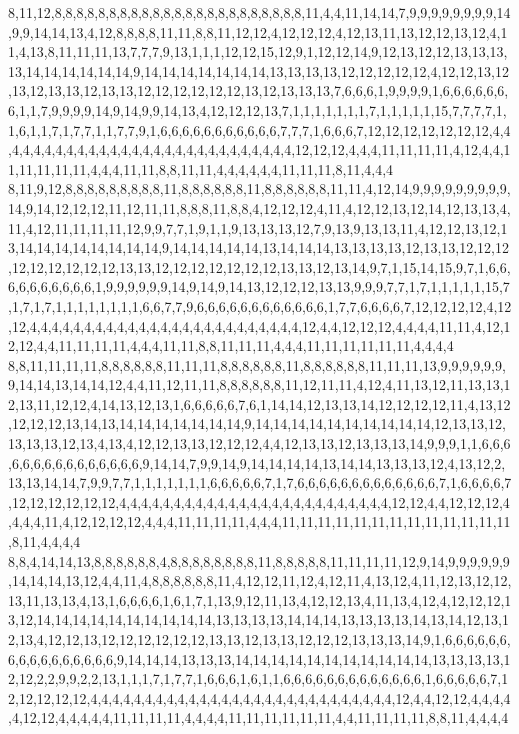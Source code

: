 8,11,12,8,8,8,8,8,8,8,8,8,8,8,8,8,8,8,8,8,8,8,8,8,8,8,11,4,4,11,14,14,7,9,9,9,9,9,9,9,9,14,9,9,14,14,13,4,12,8,8,8,8,11,11,8,8,11,12,12,4,12,12,12,4,12,13,11,13,12,12,13,12,4,11,4,13,8,11,11,11,13,7,7,7,9,13,1,1,1,12,12,15,12,9,1,12,12,14,9,12,13,12,12,13,13,13,13,14,14,14,14,14,14,9,14,14,14,14,14,14,14,13,13,13,13,12,12,12,12,12,4,12,12,13,12,13,12,13,13,12,13,13,12,12,12,12,12,12,13,12,13,13,13,7,6,6,6,1,9,9,9,9,1,6,6,6,6,6,6,6,1,1,7,9,9,9,9,14,9,14,9,9,14,13,4,12,12,12,13,7,1,1,1,1,1,1,1,7,1,1,1,1,1,15,7,7,7,7,1,1,6,1,1,7,1,7,7,1,1,7,7,9,1,6,6,6,6,6,6,6,6,6,6,6,7,7,7,1,6,6,6,7,12,12,12,12,12,12,12,4,4,4,4,4,4,4,4,4,4,4,4,4,4,4,4,4,4,4,4,4,4,4,4,4,4,4,4,12,12,12,4,4,4,11,11,11,11,4,12,4,4,11,11,11,11,11,4,4,4,11,11,8,8,11,11,4,4,4,4,4,4,11,11,11,8,11,4,4,4
8,11,9,12,8,8,8,8,8,8,8,8,8,11,8,8,8,8,8,8,11,8,8,8,8,8,8,11,11,4,12,14,9,9,9,9,9,9,9,9,9,14,9,14,12,12,12,11,12,11,11,8,8,8,11,8,8,4,12,12,12,4,11,4,12,12,13,12,14,12,13,13,4,11,4,12,11,11,11,11,12,9,9,7,7,1,9,1,1,9,13,13,13,12,7,9,13,9,13,13,11,4,12,12,13,12,13,14,14,14,14,14,14,14,14,9,14,14,14,14,14,13,14,14,14,13,13,13,13,12,13,13,12,12,12,12,12,12,12,12,12,13,13,12,12,12,12,12,12,12,13,13,12,13,14,9,7,1,15,14,15,9,7,1,6,6,6,6,6,6,6,6,6,6,1,9,9,9,9,9,9,14,9,14,9,14,13,12,12,12,13,13,9,9,9,7,7,1,7,1,1,1,1,1,15,7,1,7,1,7,1,1,1,1,1,1,1,1,6,6,7,7,9,6,6,6,6,6,6,6,6,6,6,6,6,1,7,7,6,6,6,6,7,12,12,12,12,4,12,12,4,4,4,4,4,4,4,4,4,4,4,4,4,4,4,4,4,4,4,4,4,4,4,4,4,12,4,4,12,12,12,4,4,4,4,11,11,4,12,12,12,4,4,11,11,11,11,4,4,4,11,11,8,8,11,11,11,4,4,4,11,11,11,11,11,11,4,4,4,4
8,8,11,11,11,11,8,8,8,8,8,8,11,11,11,8,8,8,8,8,8,11,8,8,8,8,8,8,11,11,11,13,9,9,9,9,9,9,9,14,14,13,14,14,12,4,4,11,12,11,11,8,8,8,8,8,8,11,12,11,11,4,12,4,11,13,12,11,13,13,12,13,11,12,12,4,14,13,12,13,1,6,6,6,6,6,7,6,1,14,14,12,13,13,14,12,12,12,12,11,4,13,12,12,12,12,13,14,13,14,14,14,14,14,14,14,9,14,14,14,14,14,14,14,14,14,14,12,13,13,12,13,13,13,12,13,4,13,4,12,12,13,13,12,12,12,4,4,12,13,13,12,13,13,13,14,9,9,9,1,1,6,6,6,6,6,6,6,6,6,6,6,6,6,6,6,9,14,14,7,9,9,14,9,14,14,14,14,13,14,14,13,13,13,12,4,13,12,2,13,13,14,14,7,9,9,7,7,1,1,1,1,1,1,1,6,6,6,6,6,7,1,7,6,6,6,6,6,6,6,6,6,6,6,6,6,7,1,6,6,6,6,7,12,12,12,12,12,12,4,4,4,4,4,4,4,4,4,4,4,4,4,4,4,4,4,4,4,4,4,4,4,4,4,12,12,4,4,12,12,12,4,4,4,4,11,4,12,12,12,12,4,4,4,11,11,11,11,4,4,4,11,11,11,11,11,11,11,11,11,11,11,11,11,8,11,4,4,4,4
8,8,4,14,14,13,8,8,8,8,8,8,4,8,8,8,8,8,8,8,8,11,8,8,8,8,8,11,11,11,11,12,9,14,9,9,9,9,9,9,14,14,14,13,12,4,4,11,4,8,8,8,8,8,8,11,4,12,12,11,12,4,12,11,4,13,12,4,11,12,13,12,12,13,11,13,13,4,13,1,6,6,6,6,1,6,1,7,1,13,9,12,11,13,4,12,12,13,4,11,13,4,12,4,12,12,12,13,12,14,14,14,14,14,14,14,14,14,14,13,13,13,13,14,14,14,13,13,13,13,14,13,14,12,13,12,13,4,12,12,13,12,12,12,12,12,12,13,13,12,13,13,12,12,12,13,13,13,14,9,1,6,6,6,6,6,6,6,6,6,6,6,6,6,6,6,6,9,14,14,14,13,13,13,14,14,14,14,14,14,14,14,14,14,14,13,13,13,13,12,12,2,2,9,9,2,2,13,1,1,1,7,1,7,7,1,6,6,6,1,6,1,1,6,6,6,6,6,6,6,6,6,6,6,6,6,1,6,6,6,6,6,7,12,12,12,12,12,4,4,4,4,4,4,4,4,4,4,4,4,4,4,4,4,4,4,4,4,4,4,4,4,4,4,4,4,12,4,4,12,12,4,4,4,4,4,12,12,4,4,4,4,4,11,11,11,11,4,4,4,4,11,11,11,11,11,11,4,4,11,11,11,11,8,8,11,4,4,4,4
